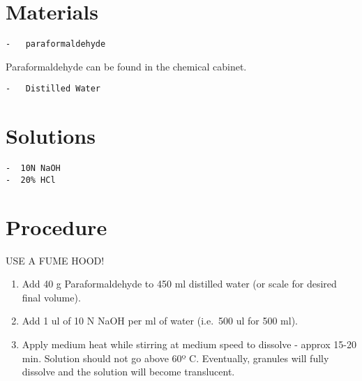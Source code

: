 \documentclass[
  letterpaper,
  DIV=11,
  numbers=noendperiod]{scrreprt}
\providecommand{\tightlist}{%
  \setlength{\itemsep}{0pt}\setlength{\parskip}{0pt}}\usepackage{longtable,booktabs,array}
\begin{document}
\hypertarget{materials-92}{%
\section{Materials}\label{materials-92}}

\begin{verbatim}
-   paraformaldehyde
\end{verbatim}

\begin{tcolorbox}[enhanced jigsaw, toprule=.15mm, breakable, coltitle=black, leftrule=.75mm, title=\textcolor{quarto-callout-note-color}{\faInfo}\hspace{0.5em}{Note}, bottomrule=.15mm, toptitle=1mm, bottomtitle=1mm, colframe=quarto-callout-note-color-frame, opacityback=0, colback=white, opacitybacktitle=0.6, colbacktitle=quarto-callout-note-color!10!white, rightrule=.15mm, titlerule=0mm, arc=.35mm, left=2mm]

Paraformaldehyde can be found in the chemical cabinet.

\end{tcolorbox}

\begin{verbatim}
-   Distilled Water
\end{verbatim}

\hypertarget{solutions-83}{%
\section{Solutions}\label{solutions-83}}

\begin{verbatim}
-  10N NaOH
-  20% HCl
\end{verbatim}

\hypertarget{procedure-92}{%
\section{Procedure}\label{procedure-92}}

USE A FUME HOOD!

\begin{enumerate}
\def\labelenumi{\arabic{enumi}.}
\tightlist
\item
  Add 40 g Paraformaldehyde to 450 ml distilled water (or scale for
  desired final volume).
\item
  Add 1 ul of 10 N NaOH per ml of water (i.e.~500 ul for 500 ml).
\item
  Apply medium heat while stirring at medium speed to dissolve - approx
  15-20 min. Solution should not go above 60º C. Eventually, granules
  will fully dissolve and the solution will become translucent.
\end{enumerate}
\end{document}
